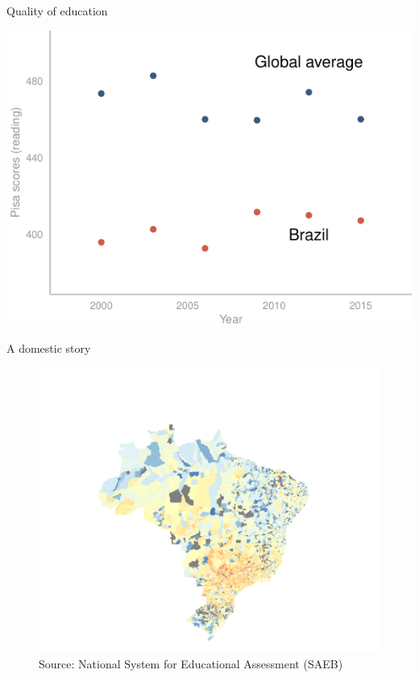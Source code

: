 \documentclass[
  ignorenonframetext,
]{beamer}
\begin{document}
\begin{frame}{Quality of education}
\protect\hypertarget{quality-of-education-1}{}

\begin{center}\includegraphics{presentation_plas_11-14-19_files/figure-beamer/unnamed-chunk-5-1} \end{center}

\end{frame}

\begin{frame}{A domestic story}
\protect\hypertarget{a-domestic-story}{}

\begin{figure}

{\centering \includegraphics{figs/saeb_map} 

}

\caption{Source: National System for Educational Assessment (SAEB)}\label{fig:unnamed-chunk-6}
\end{figure}

\end{frame}
\end{document}
